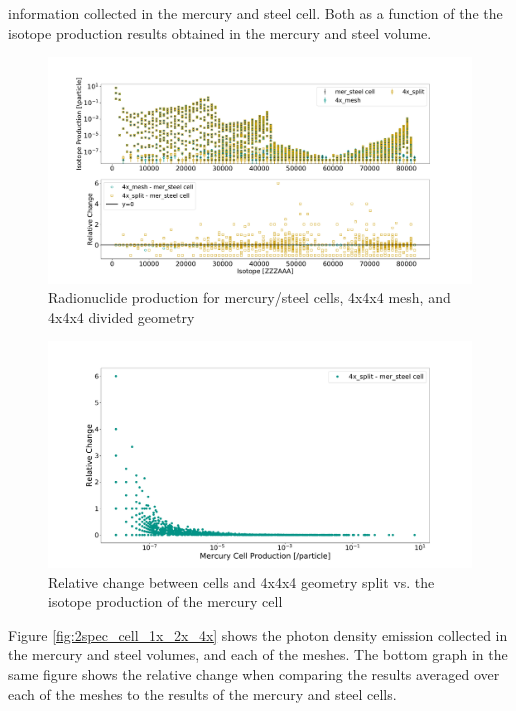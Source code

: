 information collected in the mercury and steel cell. Both as a function of the
the isotope production results obtained in the mercury and steel volume.
%
\begin{figure}[H]
 \centering
 \includegraphics[scale=0.42,trim={2cm 1cm 3cm 2cm},clip]{../figs/toy_p2/prod_VPII_4x.pdf}
 \caption{Radionuclide production for mercury/steel cells, 4x4x4 mesh, and 4x4x4 divided geometry}
 \label{fig:2prod_cell_4x}
\end{figure}
%
\begin{figure}[H]
 \centering
 \includegraphics[scale=0.4,trim={3cm 0.5cm 3cm 3cm},clip]{../figs/toy_p2/prod_VPII_rc_4x_split.pdf}
 \caption{Relative change between cells and 4x4x4 geometry split vs. the isotope production of the mercury cell}
 \label{fig:2prod_cell_4x_rc}
\end{figure}
%
Figure \ref{fig:2spec_cell_1x_2x_4x} shows the photon density emission
collected in the mercury and steel volumes, and each of the meshes. The bottom
graph in the same figure shows the relative change when comparing the results
averaged over each of the meshes to the results of the mercury and steel cells.
